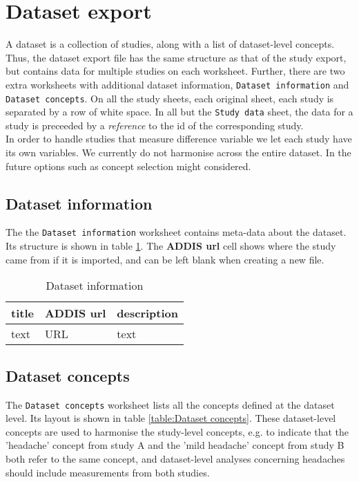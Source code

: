 \documentclass[a4paper,10pt]{article}
\begin{document}
\section{Dataset export} \label{section:dataset export}
A dataset is a collection of studies, along with a list of dataset-level concepts. Thus, the dataset export file has the same structure as that of the study export, but contains data for multiple studies on each worksheet. Further, there are two extra worksheets with additional dataset information, \texttt{Dataset information} and \texttt{Dataset concepts}. On all the study sheets,  each original sheet, each study is separated by a row of white space. In all but the \texttt{Study data} sheet, the data for a study is preceeded by a \textit{reference} to the id of the corresponding study.\\
In order to handle studies that measure difference variable we let each study have its own variables. We currently do not harmonise across the entire dataset. In the future options such as concept selection might considered.

\subsection{Dataset information}
The the \texttt{Dataset information} worksheet contains meta-data about the dataset. Its structure is shown in table \ref{table:Dataset information}. The \textbf{ADDIS url} cell shows where the study came from if it is imported, and can be left blank when creating a new file.

\begin{table}[!h]
  \centering
  \caption{Dataset information}
  \label{table:Dataset information}
  \begin{tabular}{|l|l|l|}
    \hline
    \textbf{title} & \textbf{ADDIS url} & \textbf{description} \\ \hline
    text           & URL                & text                 \\ \hline
  \end{tabular}
\end{table}

\subsection{Dataset concepts} \label{section:dataset concepts}
The \texttt{Dataset concepts} worksheet lists all the concepts defined at the dataset level. Its layout is shown in table \ref{table:Dataset concepts}. These dataset-level concepts are used to harmonise the study-level concepts, e.g. to indicate that the 'headache' concept from study A and the 'mild headache' concept from study B both refer to the same concept, and dataset-level analyses concerning headaches should include measurements from both studies.
\end{document}
